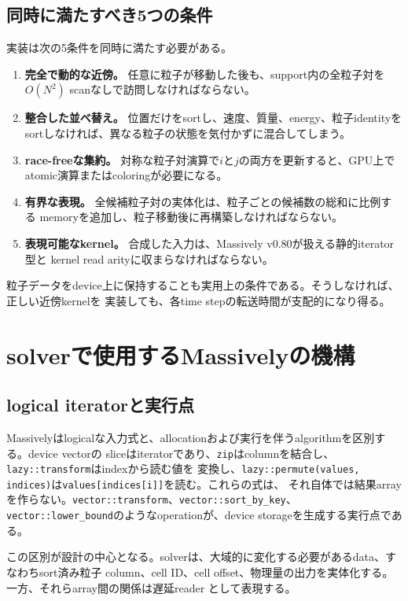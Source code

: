 \documentclass[a4paper,10pt]{ltjsarticle}
\newcommand{\code}[1]{\texttt{#1}}
\begin{document}
\subsection{同時に満たすべき5つの条件}

実装は次の5条件を同時に満たす必要がある。
\begin{enumerate}
  \item \textbf{完全で動的な近傍。} 任意に粒子が移動した後も、support内の全粒子対を
        $O(N^2)$ scanなしで訪問しなければならない。
  \item \textbf{整合した並べ替え。} 位置だけをsortし、速度、質量、energy、粒子identityを
        sortしなければ、異なる粒子の状態を気付かずに混合してしまう。
  \item \textbf{race-freeな集約。} 対称な粒子対演算で$i$と$j$の両方を更新すると、GPU上で
        atomic演算またはcoloringが必要になる。
  \item \textbf{有界な表現。} 全候補粒子対の実体化は、粒子ごとの候補数の総和に比例する
        memoryを追加し、粒子移動後に再構築しなければならない。
  \item \textbf{表現可能なkernel。} 合成した入力は、Massively v0.80が扱える静的iterator型と
        kernel read arityに収まらなければならない。
\end{enumerate}
粒子データをdevice上に保持することも実用上の条件である。そうしなければ、正しい近傍kernelを
実装しても、各time stepの転送時間が支配的になり得る。

\section{solverで使用するMassivelyの機構}

\subsection{logical iteratorと実行点}

Massivelyはlogicalな入力式と、allocationおよび実行を伴うalgorithmを区別する。device vectorの
sliceはiteratorであり、\code{zip}はcolumnを結合し、\code{lazy::transform}はindexから読む値を
変換し、\code{lazy::permute(values, indices)}は\code{values[indices[i]]}を読む。これらの式は、
それ自体では結果arrayを作らない。\code{vector::transform}、\code{vector::sort\_by\_key}、
\code{vector::lower\_bound}のようなoperationが、device storageを生成する実行点である。

この区別が設計の中心となる。solverは、大域的に変化する必要があるdata、すなわちsort済み粒子
column、cell ID、cell offset、物理量の出力を実体化する。一方、それらarray間の関係は遅延reader
として表現する。
\end{document}
